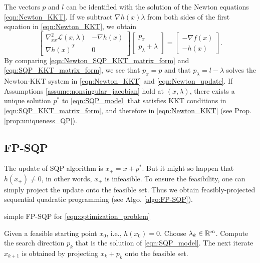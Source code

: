 \documentclass[11pt,a4paper]{article}
\begin{document}
The vectors $p$ and $l$ can be identified with the solution of the Newton equations \eqref{eqn:Newton_KKT}. If we subtract $\nabla h(x)\lambda$ from both sides of the first equation in \eqref{eqn:Newton_KKT}, we obtain
\begin{equation}
\left[
\begin{array}{cc} 
\nabla^2_{xx} \mathcal{L}(x,\lambda) & -\nabla h(x) \\ 
\nabla h(x)^T & 0
\end{array} \right]
\left[
\begin{array}{c} 
p_x \\ 
p_\lambda+\lambda
\end{array} \right] = 
\left[
\begin{array}{c} 
-\nabla f(x) \\ 
-h(x)
\end{array} \right]. \label{eqn:Newton_SQP_KKT_matrix_form}
\end{equation}
By comparing \eqref{eqn:Newton_SQP_KKT_matrix_form} and \eqref{eqn:SQP_KKT_matrix_form}, we see that $p_x = p$ and that $p_\lambda = l-\lambda$ solves the Newton-KKT system in \eqref{eqn:Newton_KKT} and \eqref{eqn:Newton_update}. 
If Assumptions \ref{assume:nonsingular_jacobian} hold at $(x,\lambda)$, there exists a unique solution $p^*$ to \eqref{eqn:SQP_model} that satisfies KKT conditions in \eqref{eqn:SQP_KKT_matrix_form}, and therefore in \eqref{eqn:Newton_KKT} (see Prop. \ref{prop:uniqueness_QP}).

\subsection{FP-SQP}

The update of SQP algorithm is $x_+ = x+p^*$. But it might so happen that $h(x_+)\neq 0$, in other words, $x_+$ is infeasible. To ensure the feasibility, one can simply project the update onto the feasible set. Thus we obtain feasibly-projected sequential quadratic programming (see Algo. \ref{algo:FP-SQP}).

\begin{algorithm}
    \centering
    \caption{simple FP-SQP for \eqref{eqn:optimization_problem}}\label{algo:FP-SQP}
    \begin{algorithmic}[1]
        \State Given a feasible starting point $x_0$, i.e., $h(x_0) = 0$.
            \State Choose $\lambda_k\in\mathbb{R}^m$.
            \State Compute the search direction $p_k$ that is the solution of \eqref{eqn:SQP_model}.
            \State The next iterate $x_{k+1}$ is obtained by projecting $x_k+p_k$ onto the feasible set.
        \EndFor
    \end{algorithmic}
\end{algorithm}
\end{document}

